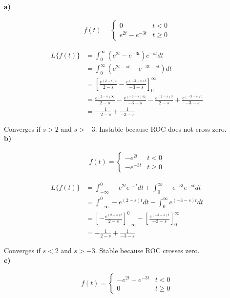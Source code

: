 \textbf{a)}

\begin{align}
    f(t) = 
    \begin{cases}
        0 & t < 0 \\
        e^{2t} - e^{-3t} & t \geq 0
    \end{cases} 
\end{align}

\begin{align*}
    L\{f(t)\} &= \int_0^\infty \left( e^{2t} - e^{-3t} \right) e^{-st} dt \\
    &= \int_0^\infty \left( e^{2t-st} - e^{-3t-st} \right) dt \\
    &= \left[ \frac{e^{(2-s)t}}{2-s} - \frac{e^{(-3-s)t}}{-3-s} \right]_0^\infty\\
    &= \frac{e^{(2-s)\infty}}{2-s} - \frac{e^{(-3-s)\infty}}{-3-s} - \frac{e^{(2-s)0}}{2-s} + \frac{e^{(-3-s)0}}{-3-s}\\
    &=  - \frac{1}{2-s} + \frac{1}{-3-s}
\end{align*}

Converges if $s > 2$ and $s > -3$.
Instable because ROC does not cross zero.
\\

\textbf{b)}

\begin{align}
    f(t) = 
    \begin{cases}
        -e^{2t} & t < 0 \\
        -e^{-3t} & t \geq 0
    \end{cases} 
\end{align}

\begin{align*}
    L\{f(t)\} &= \int_{-\infty}^0 -e^{2t} e^{-st} dt + \int_0^\infty -e^{-3t} e^{-st} dt \\
    &= \int_{-\infty}^0 -e^{(2-s)t} dt - \int_0^\infty e^{(-3-s)t} dt \\
    &= \left[ -\frac{e^{(2-s)t}}{2-s} \right]_{-\infty}^0 - \left[ \frac{e^{(-3-s)t}}{-3-s} \right]_0^\infty\\
    &= -\frac{1}{2-s} + \frac{1}{-3-s}
\end{align*}

Converges if $s < 2$ and $s > -3$.
Stable because ROC crosses zero.
\\

\textbf{c)}

\begin{align}
    f(t) = 
    \begin{cases}
        -e^{2t} + e^{-3t} & t < 0\\
        0 & t \geq 0
    \end{cases} 
\end{align}

